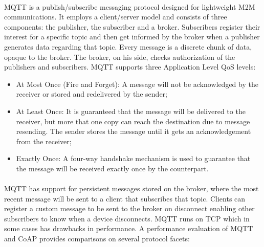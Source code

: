 \paragraph{}
	\gls{MQTT} \cite{OASIS2014} is a publish/subscribe messaging protocol designed for lightweight \gls{M2M} communications. It employs a client/server model and consists of three components: the publisher, the subscriber and a broker.
Subscribers register their interest for a specific topic and then get informed by the broker when a publisher generates data regarding that topic. Every message is a discrete chunk of data, opaque to the broker. The broker, on his side, checks authorization of the publishers and subscribers. \gls{MQTT} supports three Application Level \gls{QoS} levels:

\begin{itemize}
	\item At Most Once (Fire and Forget): A message will not be acknowledged by the receiver or stored and redelivered by the sender;\\
	\item At Least Once: It is guaranteed that the message will be delivered to the receiver, but more that one copy can reach the destination due to message resending. The sender stores the message until it gets an acknowledgement from the receiver;\\
	\item Exactly Once: A four-way handshake mechanism is used to guarantee that the message will be received exactly once by the counterpart.
\end{itemize}

\paragraph{}
\gls{MQTT} has support for persistent messages stored on the broker, where the most recent message will be sent to a client that subscribes that topic. Clients can register a custom message to be sent to the broker on disconnect enabling other subscribers to know when a device disconnects. \gls{MQTT} runs on \gls{TCP} which in some cases has drawbacks in performance. A performance evaluation of \gls{MQTT} and \gls{CoAP} \cite{Ma2014} provides comparisons on several protocol facets:

